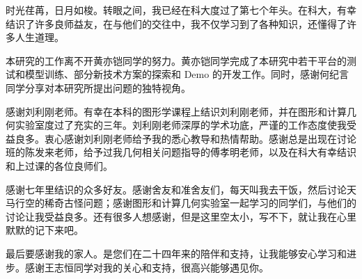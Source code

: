 
\begin{acknowledgements}

时光荏苒，日月如梭。转眼之间，我已经在科大度过了第七个年头。在科大，有幸结识了许多良师益友，在与他们的交往中，我不仅学习到了各种知识，还懂得了许多人生道理。

本研究的工作离不开黄亦铠同学的努力。黄亦铠同学完成了本研究中若干平台的测试和模型训练、部分新技术方案的探索和 Demo 的开发工作。同时，感谢何纪言同学分享对本研究所提出问题的独特视角。

感谢刘利刚老师。有幸在本科的图形学课程上结识刘利刚老师，并在图形和计算几何实验室度过了充实的三年。刘利刚老师深厚的学术功底，严谨的工作态度使我受益良多。衷心感谢刘利刚老师给予我的悉心教导和热情帮助。感谢总是出现在讨论班的陈发来老师，给予过我几何相关问题指导的傅孝明老师，以及在科大有幸结识和上过课的各位良师们。

感谢七年里结识的众多好友。感谢舍友和准舍友们，每天叫我去干饭，然后讨论天马行空的稀奇古怪问题；感谢图形和计算几何实验室一起学习的同学们，与他们的讨论让我受益良多。还有很多人想感谢，但是这里空太小，写不下，就让我在心里默默的记下来吧。

最后要感谢我的家人。是您们在二十四年来的陪伴和支持，让我能够安心学习和进步。感谢王志恒同学对我的关心和支持，很高兴能够遇见你。



\end{acknowledgements}
